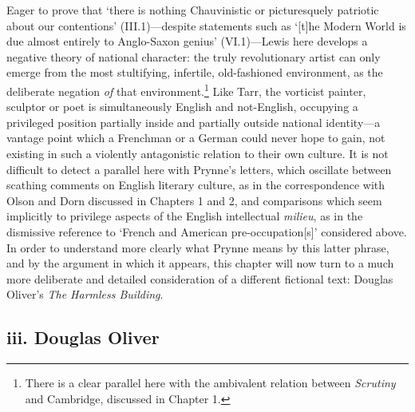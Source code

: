 \documentclass[]{article}
\begin{document}
\noindent Eager to prove that `there is nothing Chauvinistic or
picturesquely patriotic about our contentions' (III.1)---despite
statements such as `{[}t{]}he Modern World is due almost entirely to
Anglo-Saxon genius' (VI.1)---Lewis here develops a negative theory of
national character: the truly revolutionary artist can only emerge from
the most stultifying, infertile, old-fashioned environment, as the
deliberate negation \emph{of} that environment.\footnote{There is a
  clear parallel here with the ambivalent relation between
  \emph{Scrutiny} and Cambridge, discussed in Chapter 1.} Like Tarr, the
vorticist painter, sculptor or poet is simultaneously English and
not-English, occupying a privileged position partially inside and
partially outside national identity---a vantage point which a Frenchman
or a German could never hope to gain, not existing in such a violently
antagonistic relation to their own culture. It is not difficult to
detect a parallel here with Prynne's letters, which oscillate between
scathing comments on English literary culture, as in the correspondence
with Olson and Dorn discussed in Chapters 1 and 2, and comparisons which
seem implicitly to privilege aspects of the English intellectual
\emph{milieu}, as in the dismissive reference to `French and American
pre-occupation{[}s{]}' considered above. In order to understand more
clearly what Prynne means by this latter phrase, and by the argument in
which it appears, this chapter will now turn to a much more deliberate
and detailed consideration of a different fictional text: Douglas
Oliver's \emph{The Harmless Building}.

\subsection{iii. Douglas Oliver}\label{iii.-douglas-oliver}
\end{document}

